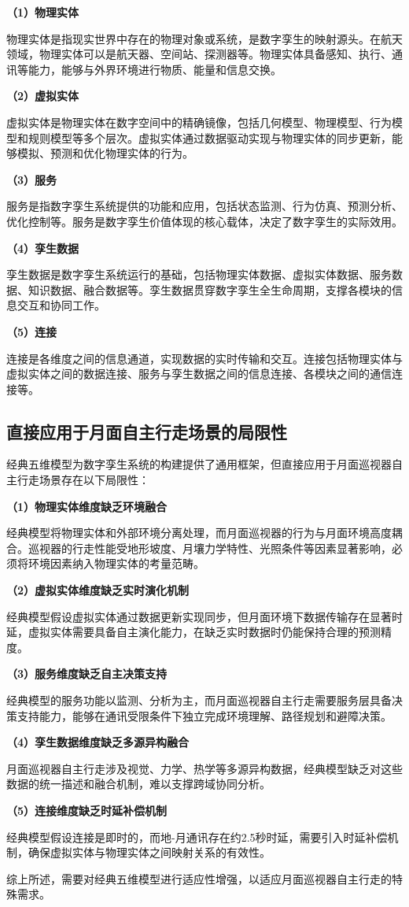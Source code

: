 \textbf{（1）物理实体}

物理实体是指现实世界中存在的物理对象或系统，是数字孪生的映射源头。在航天领域，物理实体可以是航天器、空间站、探测器等。物理实体具备感知、执行、通讯等能力，能够与外界环境进行物质、能量和信息交换。

\textbf{（2）虚拟实体}

虚拟实体是物理实体在数字空间中的精确镜像，包括几何模型、物理模型、行为模型和规则模型等多个层次。虚拟实体通过数据驱动实现与物理实体的同步更新，能够模拟、预测和优化物理实体的行为。

\textbf{（3）服务}

服务是指数字孪生系统提供的功能和应用，包括状态监测、行为仿真、预测分析、优化控制等。服务是数字孪生价值体现的核心载体，决定了数字孪生的实际效用。

\textbf{（4）孪生数据}

孪生数据是数字孪生系统运行的基础，包括物理实体数据、虚拟实体数据、服务数据、知识数据、融合数据等。孪生数据贯穿数字孪生全生命周期，支撑各模块的信息交互和协同工作。

\textbf{（5）连接}

连接是各维度之间的信息通道，实现数据的实时传输和交互。连接包括物理实体与虚拟实体之间的数据连接、服务与孪生数据之间的信息连接、各模块之间的通信连接等。

\subsection{直接应用于月面自主行走场景的局限性}
\label{subsec:limitation}

经典五维模型为数字孪生系统的构建提供了通用框架，但直接应用于月面巡视器自主行走场景存在以下局限性：

\textbf{（1）物理实体维度缺乏环境融合}

经典模型将物理实体和外部环境分离处理，而月面巡视器的行为与月面环境高度耦合。巡视器的行走性能受地形坡度、月壤力学特性、光照条件等因素显著影响，必须将环境因素纳入物理实体的考量范畴。

\textbf{（2）虚拟实体维度缺乏实时演化机制}

经典模型假设虚拟实体通过数据更新实现同步，但月面环境下数据传输存在显著时延，虚拟实体需要具备自主演化能力，在缺乏实时数据时仍能保持合理的预测精度。

\textbf{（3）服务维度缺乏自主决策支持}

经典模型的服务功能以监测、分析为主，而月面巡视器自主行走需要服务层具备决策支持能力，能够在通讯受限条件下独立完成环境理解、路径规划和避障决策。

\textbf{（4）孪生数据维度缺乏多源异构融合}

月面巡视器自主行走涉及视觉、力学、热学等多源异构数据，经典模型缺乏对这些数据的统一描述和融合机制，难以支撑跨域协同分析。

\textbf{（5）连接维度缺乏时延补偿机制}

经典模型假设连接是即时的，而地-月通讯存在约2.5秒时延，需要引入时延补偿机制，确保虚拟实体与物理实体之间映射关系的有效性。

综上所述，需要对经典五维模型进行适应性增强，以适应月面巡视器自主行走的特殊需求。
